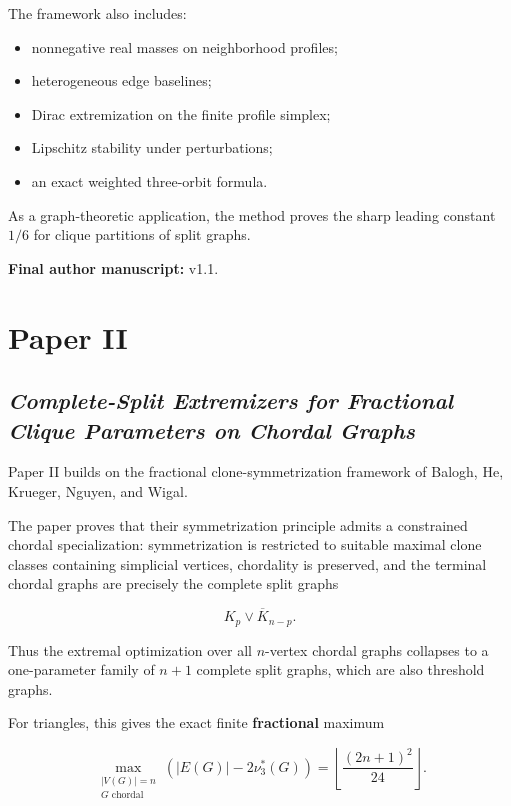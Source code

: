 \documentclass[11pt,a4paper]{article}
\begin{document}
The framework also includes:

\begin{itemize}
\item nonnegative real masses on neighborhood profiles;
\item heterogeneous edge baselines;
\item Dirac extremization on the finite profile simplex;
\item Lipschitz stability under perturbations;
\item an exact weighted three-orbit formula.
\end{itemize}

As a graph-theoretic application, the method proves the sharp leading constant \(1/6\) for clique partitions of split graphs.

\textbf{Final author manuscript:} v1.1.

\section{Paper II}

\subsection{\texorpdfstring{\emph{Complete-Split Extremizers for Fractional Clique Parameters on Chordal Graphs}}{Complete-Split Extremizers for Fractional Clique Parameters on Chordal Graphs}}

Paper II builds on the fractional clone-symmetrization framework of Balogh, He, Krueger, Nguyen, and Wigal.

The paper proves that their symmetrization principle admits a constrained chordal specialization: symmetrization is restricted to suitable maximal clone classes containing simplicial vertices, chordality is preserved, and the terminal chordal graphs are precisely the complete split graphs

\[
K_p\vee\overline K_{n-p}.
\]

Thus the extremal optimization over all \(n\)-vertex chordal graphs collapses to a one-parameter family of \(n+1\) complete split graphs, which are also threshold graphs.

For triangles, this gives the exact finite \textbf{fractional} maximum

\[
\max_{\substack{|V(G)|=n\\G\text{ chordal}}}
\left(|E(G)|-2\nu_3^*(G)\right)
=
\left\lfloor\frac{(2n+1)^2}{24}\right\rfloor.
\]
\end{document}
